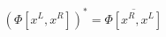 \begin{equation}\label{eq20:ps}
	(\Phi[x^{L},x^{R}])^{*}=\overline{\Phi[x^{R},x^{L}]}
\end{equation}

